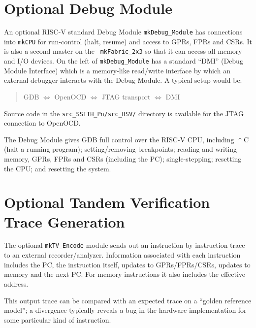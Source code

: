 \documentclass[11pt]{book}
\newcommand{\cf}{\footnotesize\tt}
\begin{document}

\section{Optional Debug Module}

\label{sec_Debug_Module}

An optional RISC-V standard Debug Module {\cf mkDebug\_Module} has
connections into {\cf mkCPU} for run-control (halt, resume) and access
to GPRs, FPRs and CSRs.  It is also a second master on the {\cf
mkFabric\_2x3} so that it can access all memory and I/O devices.  On
the left of {\cf mkDebug\_Module} has a standard ``DMI'' (Debug Module
Interface) which is a memory-like read/write interface by which an
external debugger interacts with the Debug Module.  A typical
setup would be:

\begin{quote}
GDB $\Longleftrightarrow$ OpenOCD $\Longleftrightarrow$ JTAG transport $\Longleftrightarrow$ DMI
\end{quote}

Source code in the {\cf src\_SSITH\_Pn/src\_BSV/} directory is
available for the JTAG connection to OpenOCD.

The Debug Module gives GDB full control over the RISC-V CPU, including
$\uparrow$C (halt a running program); setting/removing breakpoints;
reading and writing memory, GPRs, FPRs and CSRs (including the PC);
single-stepping; resetting the CPU; and resetting the system.


\section{Optional Tandem Verification Trace Generation}

\label{sec_Tandem_Verifier}

The optional {\cf mkTV\_Encode} module sends out an
instruction-by-instruction trace to an external recorder/analyzer.
Information associated with each instruction includes the PC, the
instruction itself, updates to GPRs/FPRs/CSRs, updates to memory and
the next PC.  For memory instructions it also includes the effective
address.

This output trace can be compared with an expected trace on a ``golden
reference model''; a divergence typically reveals a bug in the
hardware implementation for some particular kind of instruction.
\end{document}
